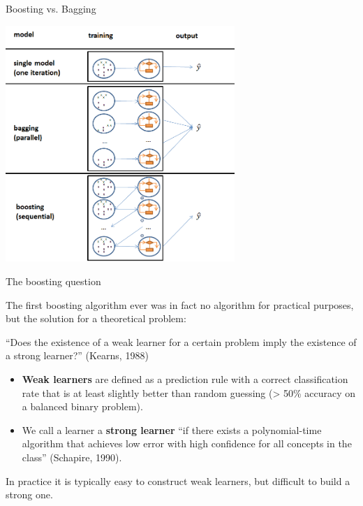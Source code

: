 \begin{vbframe}{Boosting vs. Bagging}

\begin{center}
\includegraphics[width=0.65\textwidth]{figure_man/bagging_vs_boosting.png}
\end{center}


\end{vbframe}

\begin{vbframe}{The boosting question}

The first boosting algorithm ever was in fact no algorithm for practical purposes, but the solution for a theoretical problem:

\lz

\enquote{Does the existence of a weak learner for a certain problem imply
the existence of a strong learner?} (Kearns, 1988)

\lz

\begin{itemize}
\item \textbf{Weak learners} are defined as a prediction rule with a correct classification rate that is at least slightly better than random guessing (> 50\% accuracy on a balanced binary problem).
\item We call a learner a \textbf{strong learner} \enquote{if there exists a polynomial-time algorithm that achieves low error with high confidence for all concepts in the class} (Schapire, 1990).

\end{itemize}

In practice it is typically easy to construct weak learners, but difficult to build a strong one.

\end{vbframe}



